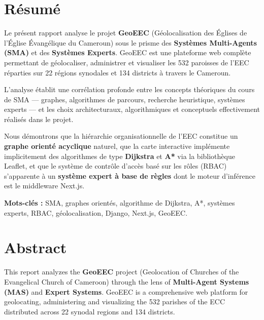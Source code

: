 \documentclass[12pt, a4paper]{report}
\theoremstyle{definition}
\begin{document}
\chapter*{Résumé}

Le présent rapport analyse le projet \textbf{GeoEEC} (Géolocalisation des Églises de l'Église Évangélique du Cameroun) sous le prisme des \textbf{Systèmes Multi-Agents (SMA)} et des \textbf{Systèmes Experts}. GeoEEC est une plateforme web complète permettant de géolocaliser, administrer et visualiser les 532 paroisses de l'EEC réparties sur 22 régions synodales et 134 districts à travers le Cameroun.

L'analyse établit une corrélation profonde entre les concepts théoriques du cours de SMA — graphes, algorithmes de parcours, recherche heuristique, systèmes experts — et les choix architecturaux, algorithmiques et conceptuels effectivement réalisés dans le projet.

Nous démontrons que la hiérarchie organisationnelle de l'EEC constitue un \textbf{graphe orienté acyclique} naturel, que la carte interactive implémente implicitement des algorithmes de type \textbf{Dijkstra} et \textbf{A*} via la bibliothèque Leaflet, et que le système de contrôle d'accès basé sur les rôles (RBAC) s'apparente à un \textbf{système expert à base de règles} dont le moteur d'inférence est le middleware Next.js.

\vspace{0.5cm}
\textbf{Mots-clés :} SMA, graphes orientés, algorithme de Dijkstra, A*, systèmes experts, RBAC, géolocalisation, Django, Next.js, GeoEEC.

\chapter*{Abstract}

This report analyzes the \textbf{GeoEEC} project (Geolocation of Churches of the Evangelical Church of Cameroon) through the lens of \textbf{Multi-Agent Systems (MAS)} and \textbf{Expert Systems}. GeoEEC is a comprehensive web platform for geolocating, administering and visualizing the 532 parishes of the ECC distributed across 22 synodal regions and 134 districts.
\end{document}
